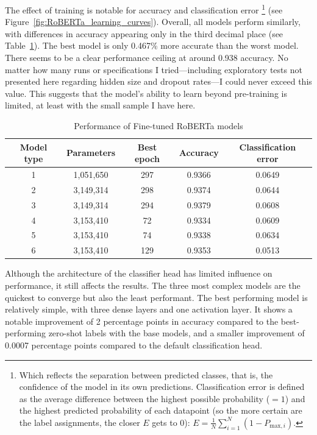 \documentclass{article}
\begin{document}
The effect of training is notable for accuracy and classification error 
\footnote{Which reflects the separation between predicted classes, that is, the confidence of the model in its own predictions. Classification error is defined as the average difference between the highest possible probability (\( =1 \)) and the highest predicted probability of each datapoint (so the more certain are the label assignments, the closer \( E \) gets to 0): $E = \frac{1}{N} \sum_{i=1}^{N} (1 - P_{\text{max},i})$.}
(see Figure~\ref{fig:RoBERTa_learning_curves}). Overall, all models perform similarly, with differences in accuracy appearing only in the third decimal place (see Table~\ref{tab:roberta_ft}). The best model is only 0.467\% more accurate than the worst model. There seems to be a clear performance ceiling at around 0.938 accuracy. No matter how many runs or specifications I tried---including exploratory tests not presented here regarding hidden size and dropout rates---I could never exceed this value. This suggests that the model’s ability to learn beyond pre-training is limited, at least with the small sample I have here.

\begin{table}
  \centering
  \begin{tabular}{ccccc}
    \toprule
    \textbf{Model type} & \textbf{Parameters} & \textbf{Best epoch} & \textbf{Accuracy} & \textbf{Classification error} \\
    \midrule
    1 & 1,051,650 & 297 & 0.9366 & 0.0649 \\
    2 & 3,149,314 & 298 & 0.9374 & 0.0644 \\
    3 & 3,149,314 & 294 & 0.9379 & 0.0608 \\
    4 & 3,153,410 & 72 & 0.9334 & 0.0609 \\
    5 & 3,153,410 & 74 & 0.9338 & 0.0634 \\
    6 & 3,153,410 & 129 & 0.9353 & 0.0513 \\
    \bottomrule
  \end{tabular}
  \vspace{0.5em}
  \caption{Performance of Fine-tuned RoBERTa models}
  \label{tab:roberta_ft}
\end{table}

Although the architecture of the classifier head has limited influence on performance, it still affects the results. The three most complex models are the quickest to converge but also the least performant. The best performing model is relatively simple, with three dense layers and one activation layer. It shows a notable improvement of 2 percentage points in accuracy compared to the best-performing zero-shot labels with the base models, and a smaller improvement of 0.0007 percentage points compared to the default classification head.
\end{document}
